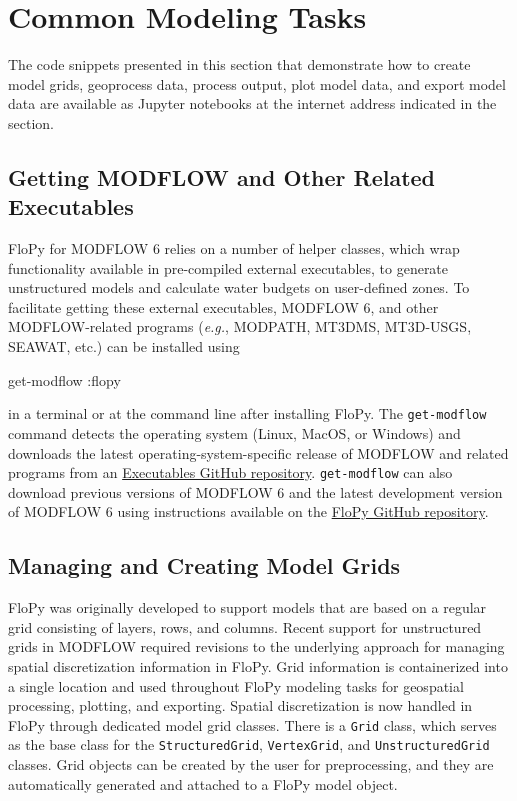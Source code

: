 \documentclass[12pt, oneside]{article}  	%
\begin{document}
\section*{Common Modeling Tasks}

The code snippets presented in this section that demonstrate how to create model grids, geoprocess data, process output, plot model data, and export model data are available as Jupyter notebooks \citep{Kluyver:2016aa} at the internet address indicated in the  section.

\subsection*{Getting MODFLOW and Other Related Executables}

FloPy for MODFLOW 6 relies on a number of helper classes, which wrap functionality available in pre-compiled external executables, to generate unstructured models and calculate water budgets on user-defined zones. To facilitate getting these external executables, MODFLOW 6, and other MODFLOW-related programs (\textit{e.g.}, MODPATH, MT3DMS, MT3D-USGS, SEAWAT, etc.) can be installed using

\begin{terminal}
get-modflow :flopy
\end{terminal}

\noindent in a terminal or at the command line after installing FloPy. The \texttt{get-modflow} command detects the operating system (Linux, MacOS, or Windows) and downloads the latest operating-system-specific release of MODFLOW and related programs from an \href{https://github.com/MODFLOW-USGS/executables}{Executables GitHub repository}. \texttt{get-modflow} can also download previous versions of MODFLOW 6 and the latest development version of MODFLOW 6 using instructions available on the \href{https://github.com/modflowpy/flopy/blob/develop/docs/get_modflow.md}{FloPy GitHub repository}.

\subsection*{Managing and Creating Model Grids}

FloPy was originally developed to support models that are based on a regular grid consisting of layers, rows, and columns. Recent support for unstructured grids in MODFLOW \citep{modflowusg, modflow6gwf} required revisions to the underlying approach for managing spatial discretization information in FloPy. Grid information is containerized into a single location and used throughout FloPy modeling tasks for geospatial processing, plotting, and exporting. Spatial discretization is now handled in FloPy through dedicated model grid classes. There is a \texttt{Grid} class, which serves as the base class for the \texttt{StructuredGrid}, \texttt{VertexGrid}, and \texttt{UnstructuredGrid} classes. Grid objects can be created by the user for preprocessing, and they are automatically generated and attached to a FloPy model object.
\end{document}

